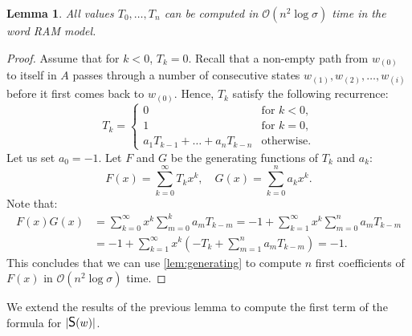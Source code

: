 \documentclass{article}
\newcommand{\mayqed}{}
\newcommand{\Oh}{\mathcal{O}}
\newcommand{\CS}{\mbox{\large{\sf{S}}}}
\newtheorem{lemma}[theorem]{Lemma}
\theoremstyle{definition}
\theoremstyle{remark}
\begin{document}
\begin{lemma}\label{lem:T}
  All values $T_0,\ldots,T_n$ can be computed in $\Oh(n^2 \log \sigma)$ time in the word RAM model.
\end{lemma}
\begin{proof}
  Assume that for $k<0$, $T_k=0$.
  Recall that a non-empty path from $w_{(0)}$ to itself in $A$ passes through a number of consecutive states
  $w_{(1)},w_{(2)},\ldots,w_{(i)}$ before it first comes back to $w_{(0)}$.
  Hence, $T_k$ satisfy the following recurrence:
  $$
    T_k = \begin{cases}
      0&\text{for }k<0,\\
      1&\text{for }k=0,\\
      a_1T_{k-1}+\ldots+a_nT_{k-n}&\text{otherwise}.
    \end{cases}
  $$
  Let us set $a_0=-1$.
  Let $F$ and $G$ be the generating functions of $T_k$ and $a_k$:
  $$F(x)=\sum_{k=0}^\infty T_k x^k,\quad G(x)=\sum_{k=0}^n a_kx^k.$$
  Note that:
  \begin{align*}
    F(x)G(x) &= \sum_{k=0}^\infty x^k\sum_{m=0}^k a_m T_{k-m}
    = -1 + \sum_{k=1}^\infty x^k\sum_{m=0}^n a_m T_{k-m} \\
    &= -1 + \sum_{k=1}^\infty x^k (-T_k + \sum_{m=1}^n a_m T_{k-m})
    = -1.
  \end{align*}
  This concludes that we can use \cref{lem:generating} to compute $n$ first coefficients of $F(x)$
  in $\Oh(n^2 \log \sigma)$ time.
\mayqed\end{proof}

We extend the results of the previous lemma to compute the first term of the formula for $|\CS(w)|$.
\end{document}
